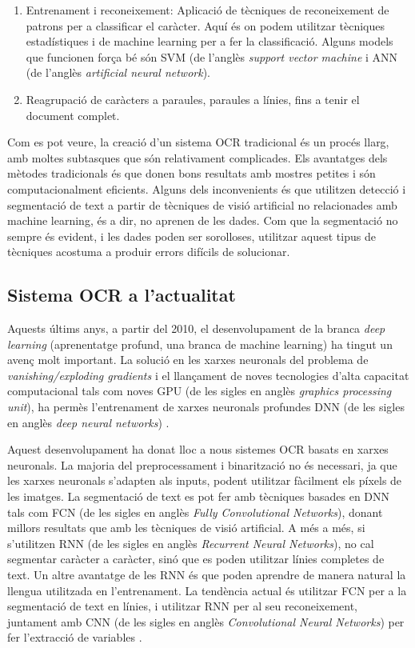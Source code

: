 \documentclass[12pt, spanish]{article}
\begin{document}
\begin{enumerate}
\item Entrenament i reconeixement: Aplicació de tècniques de reconeixement de patrons per a classificar el caràcter. Aquí és on podem utilitzar tècniques estadístiques i de machine learning per a fer la classificació. Alguns models que funcionen força bé són SVM (de l'anglès \textit{support vector machine} i ANN (de l'anglès \textit{artificial neural network}).

\item Reagrupació de caràcters a paraules, paraules a línies, fins a tenir el document complet.
\end{enumerate}

Com es pot veure, la creació d'un sistema OCR tradicional és un procés llarg, amb moltes subtasques que són relativament complicades. Els avantatges dels mètodes tradicionals és que donen bons resultats amb mostres petites i són computacionalment eficients. Alguns dels inconvenients és que utilitzen detecció i segmentació de text a partir de tècniques de visió artificial no relacionades amb machine learning, és a dir, no aprenen de les dades. Com que la segmentació no sempre és evident, i les dades poden ser sorolloses, utilitzar aquest tipus de tècniques acostuma a produir errors difícils de solucionar.


\subsection{Sistema OCR a l'actualitat}

Aquests últims anys, a partir del 2010, el desenvolupament de la branca \textit{deep learning} (aprenentatge profund, una branca de machine learning) ha tingut un avenç molt important. La solució en les xarxes neuronals del problema de \textit{vanishing/exploding gradients} i el llançament de noves tecnologies d'alta capacitat computacional tals com noves GPU (de les sigles en anglès \textit{graphics processing unit}), ha permès l'entrenament de xarxes neuronals profundes DNN (de les sigles en anglès \textit{deep neural networks}) \cite{geron2019hands}.

Aquest desenvolupament ha donat lloc a nous sistemes OCR basats en xarxes neuronals. La majoria del preprocessament i binarització no és necessari, ja que les xarxes neuronals s'adapten als inputs, podent utilitzar fàcilment els píxels de les imatges. La segmentació de text es pot fer amb tècniques basades en DNN tals com FCN (de les sigles en anglès \textit{Fully Convolutional Networks}), donant millors resultats que amb les tècniques de visió artificial. A més a més, si s'utilitzen RNN (de les sigles en anglès \textit{Recurrent Neural Networks}), no cal segmentar caràcter a caràcter, sinó que es poden utilitzar línies completes de text. Un altre avantatge de les RNN és que poden aprendre de manera natural la llengua utilitzada en l'entrenament. La tendència actual és utilitzar FCN per a la segmentació de text en línies, i utilitzar RNN per al seu reconei\-xement, juntament amb CNN (de les sigles en anglès \textit{Convolutional Neural Networks}) per fer l'extracció de variables \cite{martinek2020building}.
\end{document}
